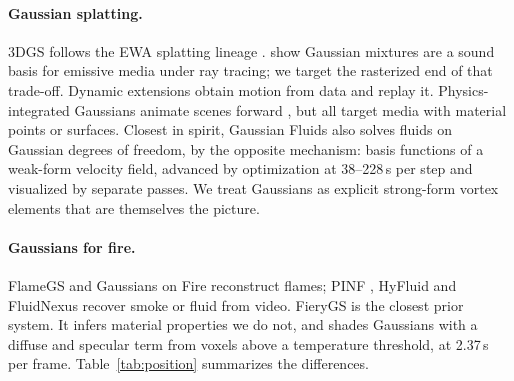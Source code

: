 \documentclass[acmtog,nonacm]{acmart}
\begin{document}
\paragraph{Gaussian splatting.} 3DGS \cite{kerbl2023} follows the EWA splatting lineage \cite{zwicker2001}. \citet{condor2025} show Gaussian mixtures are a sound basis for emissive media under ray tracing; we target the rasterized end of that trade-off. Dynamic extensions obtain motion from data \cite{luiten2024,wu2024} and replay it. Physics-integrated Gaussians animate scenes forward \cite{xie2024,feng2025,zhong2024,jiang2024}, but all target media with material points or surfaces. Closest in spirit, Gaussian Fluids \cite{xing2025} also solves fluids on Gaussian degrees of freedom, by the opposite mechanism: basis functions of a weak-form velocity field, advanced by optimization at 38--228\,s per step and visualized by separate passes. We treat Gaussians as explicit strong-form vortex elements that are themselves the picture.

\paragraph{Gaussians for fire.} FlameGS \cite{shui2024} and Gaussians on Fire \cite{nazarenus2025} reconstruct flames; PINF \cite{chu2022}, HyFluid \cite{yu2023} and FluidNexus \cite{gao2025} recover smoke or fluid from video. FieryGS \cite{shen2026} is the closest prior system. It infers material properties we do not, and shades Gaussians with a diffuse and specular term from voxels above a temperature threshold, at 2.37\,s per frame. Table~\ref{tab:position} summarizes the differences.
\end{document}
